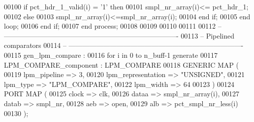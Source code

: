 \begin{DoxyCode}
00100          \textcolor{keywordflow}{if} \textcolor{vhdlchar}{pct_hdr_1_valid}\textcolor{vhdlchar}{(}\textcolor{vhdlchar}{i}\textcolor{vhdlchar}{)} \textcolor{vhdlchar}{=} \textcolor{vhdlchar}{'}\textcolor{vhdllogic}{}\textcolor{vhdllogic}{1}\textcolor{vhdlchar}{'} \textcolor{keywordflow}{then} 
00101             \textcolor{vhdlchar}{smpl_nr_array}\textcolor{vhdlchar}{(}\textcolor{vhdlchar}{i}\textcolor{vhdlchar}{)}\textcolor{vhdlchar}{<=} \textcolor{vhdlchar}{pct_hdr_1};
00102          \textcolor{keywordflow}{else} 
00103             \textcolor{vhdlchar}{smpl_nr_array}\textcolor{vhdlchar}{(}\textcolor{vhdlchar}{i}\textcolor{vhdlchar}{)}\textcolor{vhdlchar}{<=}\textcolor{vhdlchar}{smpl_nr_array}\textcolor{vhdlchar}{(}\textcolor{vhdlchar}{i}\textcolor{vhdlchar}{)};
00104          \textcolor{keywordflow}{end} \textcolor{keywordflow}{if};
00105       \textcolor{keywordflow}{end} \textcolor{keywordflow}{loop};
00106    \textcolor{keywordflow}{end} \textcolor{keywordflow}{if};
00107 \textcolor{keywordflow}{end} \textcolor{keywordflow}{process};
00108 
00109 
00110 
00111 
00112 \textcolor{keyword}{-- ----------------------------------------------------------------------------}
00113 \textcolor{keyword}{-- Pipelined comparators}
00114 \textcolor{keyword}{-- ----------------------------------------------------------------------------}
00115 \textcolor{vhdlchar}{gen\_lpm\_compare} \textcolor{vhdlchar}{:} 
00116 \textcolor{keywordflow}{for} \textcolor{vhdlchar}{i} \textcolor{keywordflow}{in} \textcolor{vhdllogic}{}\textcolor{vhdllogic}{0} \textcolor{keywordflow}{to} \textcolor{vhdlchar}{n_buff}\textcolor{vhdlchar}{-}\textcolor{vhdllogic}{}\textcolor{vhdllogic}{1} \textcolor{keywordflow}{generate}
00117 LPM\_COMPARE\_component : LPM\_COMPARE
00118     \textcolor{keywordflow}{GENERIC} \textcolor{keywordflow}{MAP} (
00119         lpm\_pipeline         => \textcolor{vhdllogic}{3},
00120         lpm\_representation   => \textcolor{keyword}{"UNSIGNED"},
00121         lpm\_type             => \textcolor{keyword}{"LPM\_COMPARE"},
00122         lpm\_width            => \textcolor{vhdllogic}{64}
00123     \textcolor{vhdlchar}{)}
00124     \textcolor{keywordflow}{PORT} \textcolor{keywordflow}{MAP} (
00125         clock                => clk,
00126         dataa                => smpl_nr_array\textcolor{vhdlchar}{(}i\textcolor{vhdlchar}{)},
00127         datab                => smpl_nr,
00128         aeb                  => \textcolor{keywordflow}{open},
00129         alb                  => pct_smpl_nr_less\textcolor{vhdlchar}{(}i\textcolor{vhdlchar}{)}
00130     \textcolor{vhdlchar}{)};

\end{DoxyCode}
